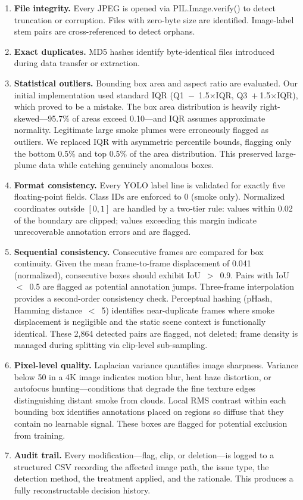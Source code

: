 \documentclass[10pt,twocolumn]{article}
\begin{document}
\begin{enumerate}
    \item \textbf{File integrity.} Every JPEG is opened via PIL.Image.verify() to detect truncation or corruption. Files with zero-byte size are identified. Image-label stem pairs are cross-referenced to detect orphans.
    \item \textbf{Exact duplicates.} MD5 hashes identify byte-identical files introduced during data transfer or extraction.
    \item \textbf{Statistical outliers.} Bounding box area and aspect ratio are evaluated. Our initial implementation used standard IQR (Q1~\(-\)~1.5\(\times\)IQR, Q3~\(+~\)1.5\(\times\)IQR), which proved to be a mistake. The box area distribution is heavily right-skewed---95.7\% of areas exceed 0.10---and IQR assumes approximate normality. Legitimate large smoke plumes were erroneously flagged as outliers. We replaced IQR with asymmetric percentile bounds, flagging only the bottom 0.5\% and top 0.5\% of the area distribution. This preserved large-plume data while catching genuinely anomalous boxes.
    \item \textbf{Format consistency.} Every YOLO label line is validated for exactly five floating-point fields. Class IDs are enforced to 0 (smoke only). Normalized coordinates outside \([0,1]\) are handled by a two-tier rule: values within 0.02 of the boundary are clipped; values exceeding this margin indicate unrecoverable annotation errors and are flagged.
    \item \textbf{Sequential consistency.} Consecutive frames are compared for box continuity. Given the mean frame-to-frame displacement of 0.041 (normalized), consecutive boxes should exhibit IoU~\(>\)~0.9. Pairs with IoU~\(<\)~0.5 are flagged as potential annotation jumps. Three-frame interpolation provides a second-order consistency check. Perceptual hashing (pHash, Hamming distance~\(<\)~5) identifies near-duplicate frames where smoke displacement is negligible and the static scene context is functionally identical. These 2,864 detected pairs are flagged, not deleted; frame density is managed during splitting via clip-level sub-sampling.
    \item \textbf{Pixel-level quality.} Laplacian variance quantifies image sharpness. Variance below 50 in a 4K image indicates motion blur, heat haze distortion, or autofocus hunting---conditions that degrade the fine texture edges distinguishing distant smoke from clouds. Local RMS contrast within each bounding box identifies annotations placed on regions so diffuse that they contain no learnable signal. These boxes are flagged for potential exclusion from training.
    \item \textbf{Audit trail.} Every modification---flag, clip, or deletion---is logged to a structured CSV recording the affected image path, the issue type, the detection method, the treatment applied, and the rationale. This produces a fully reconstructable decision history.
\end{enumerate}
\end{document}

